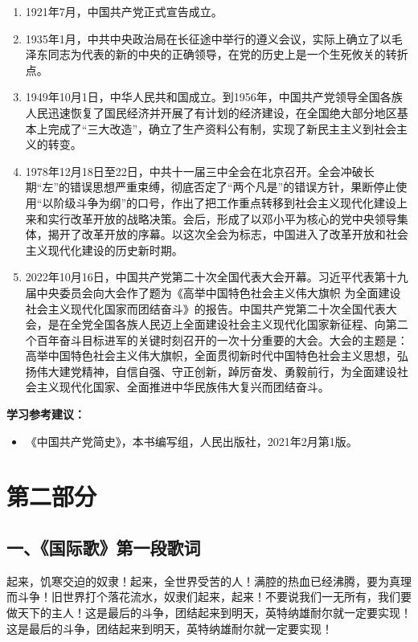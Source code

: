 \documentclass[UTF8,11pt,a4paper]{ctexart}
\begin{document}
\begin{enumerate}[label=\arabic*., leftmargin=2.3em]
\item 1921年7月，中国共产党正式宣告成立。
\item 1935年1月，中共中央政治局在长征途中举行的遵义会议，实际上确立了以毛泽东同志为代表的新的中央的正确领导，在党的历史上是一个生死攸关的转折点。
\item 1949年10月1日，中华人民共和国成立。到1956年，中国共产党领导全国各族人民迅速恢复了国民经济并开展了有计划的经济建设，在全国绝大部分地区基本上完成了“三大改造”，确立了生产资料公有制，实现了新民主主义到社会主义的转变。
\item 1978年12月18日至22日，中共十一届三中全会在北京召开。全会冲破长期“左”的错误思想严重束缚，彻底否定了“两个凡是”的错误方针，果断停止使用“以阶级斗争为纲”的口号，作出了把工作重点转移到社会主义现代化建设上来和实行改革开放的战略决策。会后，形成了以邓小平为核心的党中央领导集体，揭开了改革开放的序幕。以这次全会为标志，中国进入了改革开放和社会主义现代化建设的历史新时期。
\item 2022年10月16日，中国共产党第二十次全国代表大会开幕。习近平代表第十九届中央委员会向大会作了题为《高举中国特色社会主义伟大旗帜 为全面建设社会主义现代化国家而团结奋斗》的报告。中国共产党第二十次全国代表大会，是在全党全国各族人民迈上全面建设社会主义现代化国家新征程、向第二个百年奋斗目标进军的关键时刻召开的一次十分重要的大会。大会的主题是：高举中国特色社会主义伟大旗帜，全面贯彻新时代中国特色社会主义思想，弘扬伟大建党精神，自信自强、守正创新，踔厉奋发、勇毅前行，为全面建设社会主义现代化国家、全面推进中华民族伟大复兴而团结奋斗。
\end{enumerate}

\noindent\textbf{学习参考建议：}
\begin{itemize}[leftmargin=2em,label={}]
\item 《中国共产党简史》，本书编写组，人民出版社，2021年2月第1版。
\end{itemize}

\section*{第二部分}

\subsection*{一、《国际歌》第一段歌词}

起来，饥寒交迫的奴隶！起来，全世界受苦的人！满腔的热血已经沸腾，要为真理而斗争！旧世界打个落花流水，奴隶们起来，起来！不要说我们一无所有，我们要做天下的主人！这是最后的斗争，团结起来到明天，英特纳雄耐尔就一定要实现！这是最后的斗争，团结起来到明天，英特纳雄耐尔就一定要实现！
\end{document}
